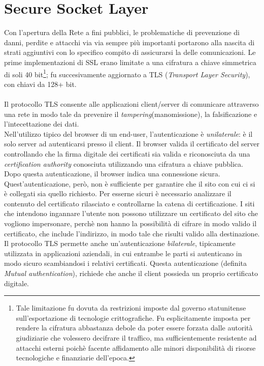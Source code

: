 \section{Secure Socket Layer}
Con l'apertura della Rete a fini pubblici, le problematiche di prevenzione di danni, perdite e attacchi via via sempre più importanti portarono alla nascita di strati aggiuntivi con lo specifico compito di assicurarsi la delle comunicazioni.
Le prime implementazioni di SSL erano limitate a una cifratura a chiave simmetrica di soli 40 bit\footnote{Tale limitazione fu dovuta da restrizioni imposte dal governo statunitense sull'esportazione di tecnologie crittografiche. Fu esplicitamente imposta per rendere la cifratura abbastanza debole da poter essere forzata dalle autorità giudiziarie che volessero decifrare il traffico, ma sufficientemente resistente ad attacchi esterni poichè facente affidamento alle minori disponibilità di risorse tecnologiche e finanziarie dell'epoca.}; fu succesivamente aggiornato a TLS (\textit{Transport Layer Security}), con chiavi da 128+ bit.\\\\
Il protocollo TLS consente alle applicazioni client/server di comunicare attraverso una rete in modo tale da prevenire il \textit{tampering}(manomissione), la falsificazione e l'intecettazione dei dati.\\
Nell'utilizzo tipico del browser di un end-user, l'autenticazione è \textit{unilaterale}: è il solo server ad autenticarsi presso il client. Il browser valida il certificato del server controllando che la firma digitale dei certificati sia valida e riconosciuta da una \textit{certification authority} conosciuta utilizzando una cifratura a chiave pubblica. Dopo questa autenticazione, il browser indica una connessione sicura.\\
Quest'autenticazione, però, non è sufficiente per garantire che il sito con cui ci si è collegati sia quello richiesto. Per esserne sicuri è necessario analizzare il contenuto del certificato rilasciato e controllarne la catena di certificazione. I siti che intendono ingannare l'utente non possono utilizzare un certificato del sito che vogliono impersonare, perchè non hanno la possibilità di cifrare in modo valido il certificato, 
che include l'indirizzo, in modo tale che risulti valido alla destinazione.\\
Il protocollo TLS permette anche un'autenticazione \textit{bilaterale}, tipicamente utilizzata in applicazioni aziendali, in cui entrambe le parti si autenticano in modo sicuro scambiandosi i relativi certificati. Questa autenticazione (definita \textit\textit{Mutual authentication}), richiede che anche il client possieda un proprio certificato digitale.\\


